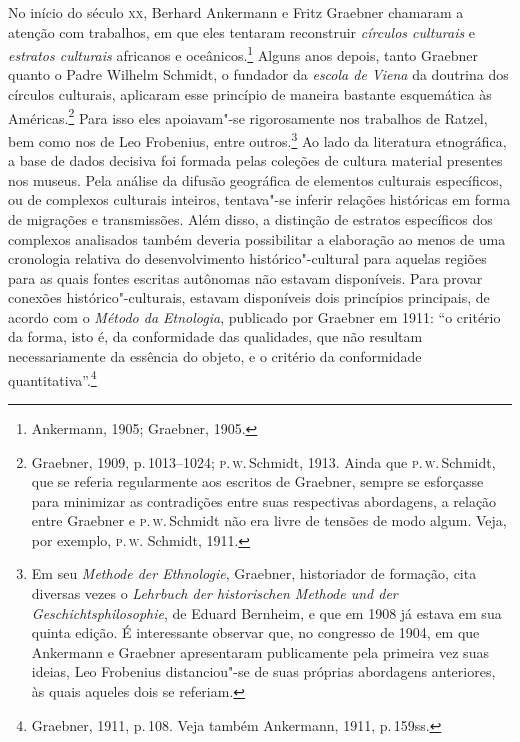 No início do século \textsc{xx}, Berhard Ankermann e Fritz Graebner
chamaram a atenção com trabalhos, em que eles tentaram
reconstruir \textit{círculos culturais} e \textit{estratos culturais} africanos e
oceânicos.\footnote{Ankermann, 1905; Graebner, 1905.} Alguns anos
depois, tanto Graebner quanto o Padre Wilhelm Schmidt, o
fundador da \textit{escola de Viena} da doutrina dos círculos culturais,
aplicaram esse princípio de maneira bastante esquemática às
Américas.\footnote{Graebner, 1909, p.\,1013--1024; \textsc{p}.\,\textsc{w}.\,Schmidt, 1913.
  Ainda que \textsc{p}.\,\textsc{w}.\,Schmidt, que se referia regularmente aos escritos de
  Graebner, sempre se esforçasse para minimizar as contradições entre
  suas respectivas abordagens, a relação entre Graebner e \textsc{p}.\,\textsc{w}.\,Schmidt
  não era livre de tensões de modo algum. Veja, por exemplo, \textsc{p}.\,\textsc{w}. Schmidt, 1911.} Para isso eles apoiavam"-se rigorosamente nos trabalhos
de Ratzel, bem como nos de Leo Frobenius, entre
outros.\footnote{Em seu \textit{Methode der Ethnologie}, Graebner, historiador de formação, cita diversas vezes
  o \textit{Lehrbuch der historischen Methode und der
  Geschichtsphilosophie}, de Eduard Bernheim, e que em 1908 já estava em sua quinta
  edição. É interessante observar que, no congresso de 1904, em que
  Ankermann e Graebner apresentaram publicamente pela primeira vez suas
  ideias, Leo Frobenius distanciou"-se de suas próprias abordagens
  anteriores, às quais aqueles dois se referiam.} Ao lado da literatura
etnográfica, a base de dados decisiva foi formada pelas coleções de
cultura material presentes nos museus. Pela análise da difusão
geográfica de elementos culturais específicos, ou de complexos
culturais inteiros, tentava"-se inferir relações históricas em forma de
migrações e transmissões. Além disso, a distinção de estratos
específicos dos complexos analisados também deveria possibilitar a
elaboração ao menos de uma cronologia relativa do desenvolvimento
histórico"-cultural para aquelas regiões para as quais fontes escritas
autônomas não estavam disponíveis. Para provar conexões
histórico"-culturais, estavam disponíveis dois princípios principais, de
acordo com o \textit{Método da Etnologia},
publicado por Graebner em 1911: ``o critério da forma, isto é, da
conformidade das qualidades, que não resultam necessariamente da
essência do objeto, e o critério da conformidade quantitativa''.\footnote{Graebner, 1911, p.\,108. Veja também Ankermann, 1911, p.\,159ss.}

